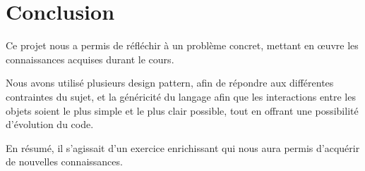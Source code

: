 \documentclass{article}
\begin{document}
\clearpage %

\vfill
\section*{Conclusion}

Ce projet nous a permis de réfléchir à un problème concret, mettant en œuvre les connaissances acquises durant le cours.\par
Nous avons utilisé plusieurs design pattern, afin de répondre aux différentes contraintes du sujet,
et la généricité du langage afin que les interactions entre les objets soient le plus simple et le plus clair possible, tout en offrant une possibilité d'évolution du code.\par
En résumé, il s'agissait d'un exercice enrichissant qui nous aura permis d'acquérir de nouvelles connaissances.
\vfill
\end{document}
